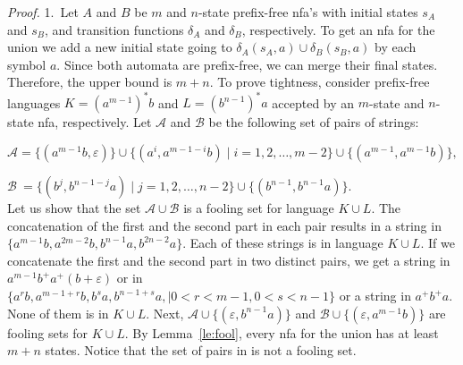 \documentclass[copyright]{eptcs}
\newcommand{\eps}{\varepsilon}
\begin{document}
 \noindent\emph{Proof.}
  1.~Let $A$ and $B$ be $m$ and $n$-state prefix-free nfa's
  with initial states $s_A$ and $s_B$,
  and transition functions $\delta_A$ and $\delta_B$, respectively.
  To get an nfa for the union we add a new initial state
  going to $\delta_A(s_A,a)\cup \delta_B(s_B,a)$ by each symbol $a$.
  Since both automata are prefix-free,
  we can merge their final states.
  Therefore, the upper bound is $m+n$.
  To prove tightness, consider  prefix-free languages
  $K=(a^{m-1})^*b$ and $L=(b^{n-1})^*a$
  accepted by an $m$-state and $n$-state nfa, respectively.
  Let $\mathcal{A}$ and $\mathcal{B}$ be the following set of pairs of strings:
  
  $\mathcal{A} = \{(a^{m-1}b,\eps)\}\cup\{(a^i,a^{m-1-i}b)
                       \mid i=1,2,\ldots, m-2\}\cup\{(a^{m-1},a^{m-1}b)\},$
                       
  $\mathcal{B}\  =  \{(b^j,b^{n-1-j}a)
                       \mid j=1,2,\ldots, n-2\}\cup\{(b^{n-1},b^{n-1}a)\}.$ \\
   Let us show that the set $\mathcal{A}\cup \mathcal{B}$
   is a fooling set for  language $K\cup L$.
   The concatenation of the first and the second part in each pair results
   in a string in $\{a^{m-1}b,a^{2m-2}b,b^{n-1}a,b^{2n-2}a\}$.
   Each of these strings is in language $K\cup L$.
   If we concatenate
   the first and the second part in two distinct pairs,
   we get a string in 
   $a^{m-1}b^+a^+(b+\eps)$ or in
   $\{a^rb, a^{m-1+r}b, b^sa, b^{n-1+s}a, \mid 0<r<m-1,0<s<n-1\}$
   or a string in $ a^+b^+a$.
   None of them  is in $K\cup L$.
   Next,  $\mathcal{A} \cup \{(\eps,b^{n-1}a)\}$
   and $\mathcal{B}\cup\{(\eps,a^{m-1}b)\}$
   are fooling sets for $K\cup L$.
   By Lemma~\ref{le:fool}, every nfa for the union
   has at least $m+n$ states. 
   Notice that the set of pairs in \cite{hs09n} is not a fooling set. 
\end{document}
